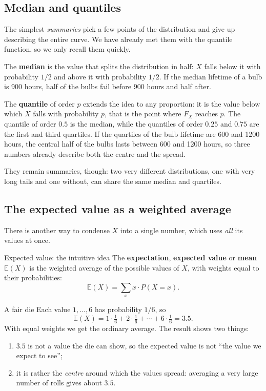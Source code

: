 \documentclass[a4paper,12pt,oneside]{report}
\begin{document}
\subsection{Median and quantiles}\label{sec:median}

The simplest \emph{summaries} pick a few points of the distribution and
give up describing the entire curve. We have already met them with the
quantile function, so we only recall them quickly.

The \textbf{median} is the value that splits the distribution in half: $X$
falls below it with probability $1/2$ and above it with probability $1/2$.
If the median lifetime of a bulb is 900 hours, half of the bulbs fail before
900 hours and half after.

The \textbf{quantile} of order $p$ extends the idea to any proportion: it is
the value below which $X$ falls with probability $p$, that is the point
where $F_X$ reaches $p$. The quantile of order $0.5$ is the median, while
the quantiles of order $0.25$ and $0.75$ are the first and third quartiles.
If the quartiles of the bulb lifetime are 600 and 1200 hours, the central
half of the bulbs lasts between 600 and 1200 hours, so three numbers
already describe both the centre and the spread.

They remain summaries, though: two very different distributions, one with
very long tails and one without, can share the same median and quartiles.

\subsection{The expected value as a weighted average}

There is another way to condense $X$ into a single number, which uses \emph{all} its values
at once.

\begin{frameddefn}{Expected value: the intuitive idea}
The \textbf{expectation}, \textbf{expected value} or \textbf{mean}
$\mathbb{E}(X)$ is the weighted average of the possible values of $X$, with
weights equal to their probabilities:
\[
\mathbb{E}(X)=\sum_x x\cdot P(X=x).
\]
\end{frameddefn}

\begin{framedexample}{A fair die}
Each value $1,\ldots,6$ has probability $1/6$, so
\[
\mathbb{E}(X)=1\cdot\tfrac16+2\cdot\tfrac16+\cdots+6\cdot\tfrac16=3.5 .
\]
With equal weights we get the ordinary average. The result shows two
things:
\begin{enumerate}
\item $3.5$ is not a value the die can show, so the expected value is not
``the value we expect to see'';
\item it is rather the \emph{centre} around which the values spread:
averaging a very large number of rolls gives about $3.5$.
\end{enumerate}
\end{framedexample}
\end{document}
